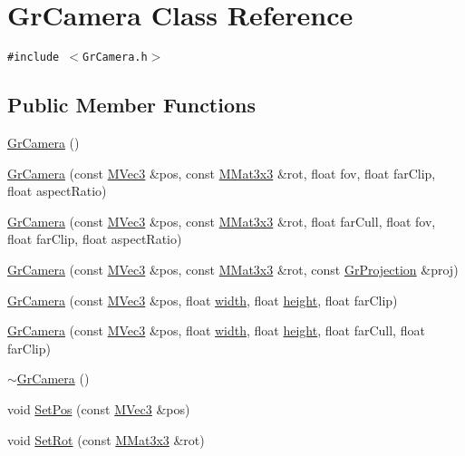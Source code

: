 \hypertarget{class_gr_camera}{
\section{GrCamera Class Reference}
\label{class_gr_camera}
}
{\tt \#include $<$GrCamera.h$>$}

\subsection*{Public Member Functions}
\begin{CompactItemize}
\item 
\hyperlink{class_gr_camera_06a0223e496154f4b35e4a81038c8cf1}{GrCamera} ()
\item 
\hyperlink{class_gr_camera_1dde80de1939b3d6c7b974688dcde414}{GrCamera} (const \hyperlink{class_m_vec3}{MVec3} \&pos, const \hyperlink{class_m_mat3x3}{MMat3x3} \&rot, float fov, float farClip, float aspectRatio)
\item 
\hyperlink{class_gr_camera_f2e9d46db59e3f9bdddcf2b07c76c3e3}{GrCamera} (const \hyperlink{class_m_vec3}{MVec3} \&pos, const \hyperlink{class_m_mat3x3}{MMat3x3} \&rot, float farCull, float fov, float farClip, float aspectRatio)
\item 
\hyperlink{class_gr_camera_bc7e35d6d71f0dadd62220bf3e7d66a3}{GrCamera} (const \hyperlink{class_m_vec3}{MVec3} \&pos, const \hyperlink{class_m_mat3x3}{MMat3x3} \&rot, const \hyperlink{class_gr_projection}{GrProjection} \&proj)
\item 
\hyperlink{class_gr_camera_c11424288ad427b92ea62aa4e55cf947}{GrCamera} (const \hyperlink{class_m_vec3}{MVec3} \&pos, float \hyperlink{wglext_8h_e6531b1788ca42a9ae8155b0c52e7630}{width}, float \hyperlink{wglext_8h_b2e63df950c3789599e1e43f477bc9e3}{height}, float farClip)
\item 
\hyperlink{class_gr_camera_f5b22b62e8bc91b53d64080b65a0ec68}{GrCamera} (const \hyperlink{class_m_vec3}{MVec3} \&pos, float \hyperlink{wglext_8h_e6531b1788ca42a9ae8155b0c52e7630}{width}, float \hyperlink{wglext_8h_b2e63df950c3789599e1e43f477bc9e3}{height}, float farCull, float farClip)
\item 
\hyperlink{class_gr_camera_43ac986a04d8a1c7c993344f190b230f}{$\sim$GrCamera} ()
\item 
void \hyperlink{class_gr_camera_75ce5e2e567fbce90d92d8048b33c1b4}{SetPos} (const \hyperlink{class_m_vec3}{MVec3} \&pos)
\item 
void \hyperlink{class_gr_camera_8c8f33ad67141bad930c367ffa9db7ac}{SetRot} (const \hyperlink{class_m_mat3x3}{MMat3x3} \&rot)

\end{CompactItemize}
